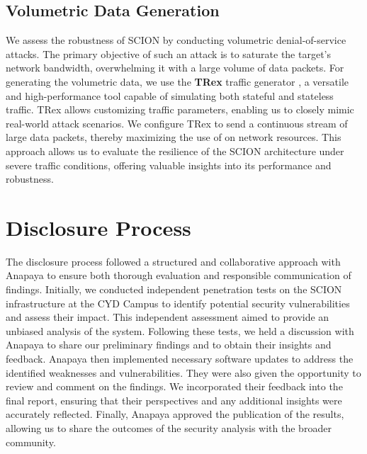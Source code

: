 \newpage

\subsection{Volumetric Data Generation}
We assess the robustness of SCION by conducting volumetric denial-of-service attacks.
The primary objective of such an attack is to saturate the target's network bandwidth, overwhelming it with a large volume of data packets.
For generating the volumetric data, we use the \textbf{TRex} traffic generator \cite{trexWebsite}, a versatile and high-performance tool capable of simulating both stateful and stateless traffic.
TRex allows customizing traffic parameters, enabling us to closely mimic real-world attack scenarios.
We configure TRex to send a continuous stream of large data packets, thereby maximizing the use of on network resources.
This approach allows us to evaluate the resilience of the SCION architecture under severe traffic conditions, offering valuable insights into its performance and robustness.

\section{Disclosure Process}
\label{sec:methodology:disclosure}

The disclosure process followed a structured and collaborative approach with Anapaya to ensure both thorough evaluation and responsible communication of findings.
Initially, we conducted independent penetration tests on the SCION infrastructure at the CYD Campus to identify potential security vulnerabilities and assess their impact.
This independent assessment aimed to provide an unbiased analysis of the system.
Following these tests, we held a discussion with Anapaya to share our preliminary findings and to obtain their insights and feedback.
Anapaya then implemented necessary software updates to address the identified weaknesses and vulnerabilities.
They were also given the opportunity to review and comment on the findings.
We incorporated their feedback into the final report, ensuring that their perspectives and any additional insights were accurately reflected.
Finally, Anapaya approved the publication of the results, allowing us to share the outcomes of the security analysis with the broader community.

